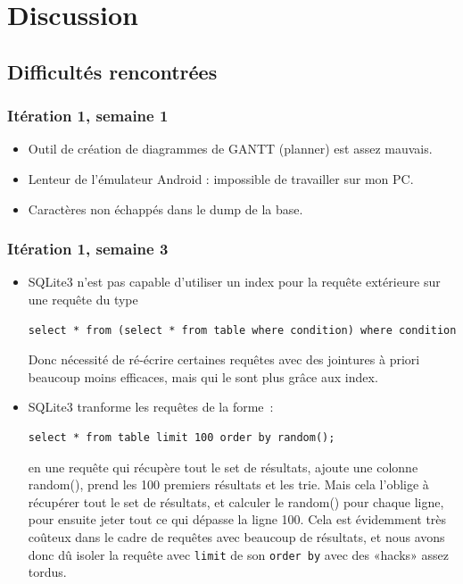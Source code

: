 \documentclass[a4paper,11pt,french]{article}
\def\android{Android\texttrademark{}}
\begin{document}
\section{Discussion}
\subsection{Difficultés rencontrées}
\label{sec:difficultes}
\subsubsection{Itération 1, semaine 1}
\begin{itemize}
\item Outil de création de diagrammes de GANTT (planner) est assez mauvais.
\item Lenteur de l'émulateur \android{} : impossible de travailler sur mon PC.%
\item Caractères non échappés dans le dump de la base.%
\end{itemize}

\subsubsection{Itération 1, semaine 3}
\begin{itemize}
\item SQLite3 n'est pas capable d'utiliser un index pour la requête extérieure sur une requête du type

\begin{verbatim}
select * from (select * from table where condition) where condition
\end{verbatim}

Donc nécessité de ré-écrire certaines requêtes avec des jointures à priori beaucoup moins efficaces, mais qui le sont plus grâce aux index.
\item SQLite3 tranforme les requêtes de la forme~:

\begin{verbatim}
select * from table limit 100 order by random();
\end{verbatim}

  en une requête qui récupère tout le set de résultats, ajoute une colonne random(), prend les 100 premiers résultats et les trie. Mais cela
  l'oblige à récupérer tout le set de résultats, et calculer le random() pour chaque ligne, pour ensuite jeter tout ce qui dépasse la ligne
  100. Cela est évidemment très coûteux dans le cadre de requêtes avec beaucoup de résultats, et nous avons donc dû isoler la requête avec
  \verb!limit! de son \verb!order by! avec des «hacks» assez tordus.
\end{itemize}
\end{document}
